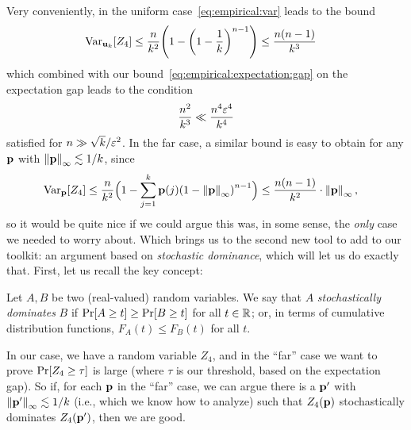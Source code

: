 Very conveniently, in the uniform case~\cref{eq:empirical:var} leads to the bound
\begin{align}
  \label{eq:empirical:var:unif}
  \Var_{\uniform_\ab}[Z_4] 
  &\leq \frac{\ns}{\ab^2} \Paren{ 1 - \Paren{1-\frac{1}{\ab}}^{\ns-1} } \leq \frac{\ns(\ns-1)}{\ab^3}
\end{align}
which combined with our bound~\cref{eq:empirical:expectation:gap} on the expectation gap leads to the condition
\[
    \frac{n^2}{k^3} \ll \frac{n^4\varepsilon^4}{k^4}
\]
satisfied for $n \gg \sqrt{k}/\varepsilon^2$. In the far case, a similar bound is easy to obtain for any $\mathbf{p}$ with $\norminf{\p} \lesssim 1/\ab$, since
\begin{align}
  \label{eq:empirical:var:lowinfty}
  \Var_{\p}[Z_4] 
  &\leq \frac{\ns}{\ab^2} \Big({ 1 - \sum_{j=1}^\ab \p(j) \Paren{1-\norminf{\p}}^{\ns-1} } \Big)
   \leq \frac{\ns(\ns-1)}{\ab^2}\cdot \norminf{\p}\,,
\end{align}
so it would be quite nice if we could argue this was, in some sense, the \emph{only} case we needed to worry about. Which brings us to the second new tool to add to our toolkit: an argument based on \emph{stochastic dominance}, which will let us do exactly that. First, let us recall the key concept:
\begin{definition}
Let $A,B$ be two (real-valued) random variables. We say that $A$ \emph{stochastically dominates} $B$ if $\bPr{A \geq t} \geq \bPr{B \geq t}$ for all $t\in\mathbb{R}$; or, in terms of cumulative distribution functions, $F_A(t) \leq F_B(t)$ for all $t$.
\end{definition}
In our case, we have a random variable $Z_4$, and in the ``far'' case we want to prove $\bPr{Z_4 \geq \tau}$ is large (where $\tau$ is our threshold, based on the expectation gap). So if, for each $\mathbf{p}$ in the ``far'' case, we can argue there is a $\mathbf{p}'$  with $\norminf{\p'} \lesssim 1/\ab$ (i.e., which we know how to analyze) such that $Z_4(\mathbf{p})$ stochastically dominates $Z_4(\mathbf{p}')$, then we are good.

